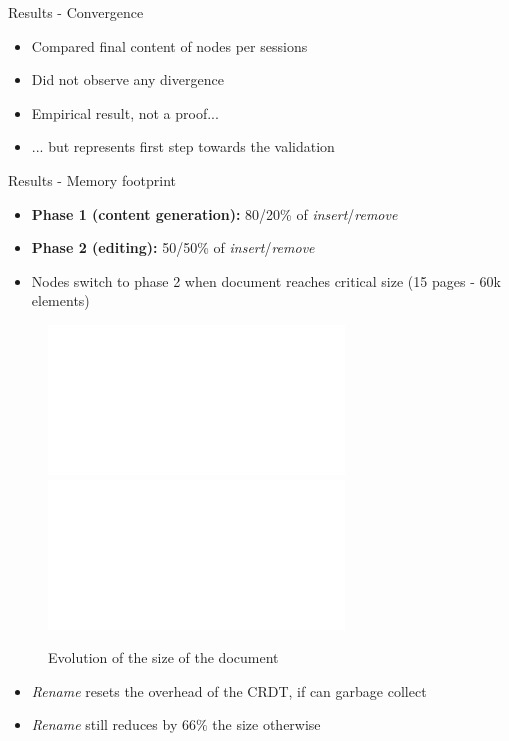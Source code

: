 \documentclass[10pt]{beamer}
\begin{document}
\begin{frame}{Results - Convergence}
  \begin{itemize}
    \item Compared final content of nodes per sessions
    \item Did not observe any divergence
    \bigskip
    \item Empirical result, not a proof...
    \item ... but represents first step towards the validation
  \end{itemize}
\end{frame}

\begin{frame}{Results - Memory footprint}
  \begin{itemize}
    \item \textbf{Phase 1 (content generation):} 80/20\% of \emph{insert}/\emph{remove}
    \item \textbf{Phase 2 (editing):} 50/50\% of \emph{insert}/\emph{remove}
    \item Nodes switch to phase 2 when document reaches critical size (15 pages - 60k elements)
  \end{itemize}

  \begin{figure}
    \centering
    \includegraphics<2>[width=0.7\textwidth]{img/snapshots-sizes-2.pdf}
    \includegraphics<3>[width=0.7\textwidth]{img/snapshots-sizes.pdf}
    \caption{Evolution of the size of the document}
    \label{fig:evolution-document-size}
  \end{figure}

  \vspace{-1\baselineskip}
  \begin{itemize}
    \item<2-> \emph{Rename} resets the overhead of the CRDT, if can garbage collect
    \item<3> \emph{Rename} still reduces by $66\%$ the size otherwise
  \end{itemize}
\end{frame}
\end{document}
